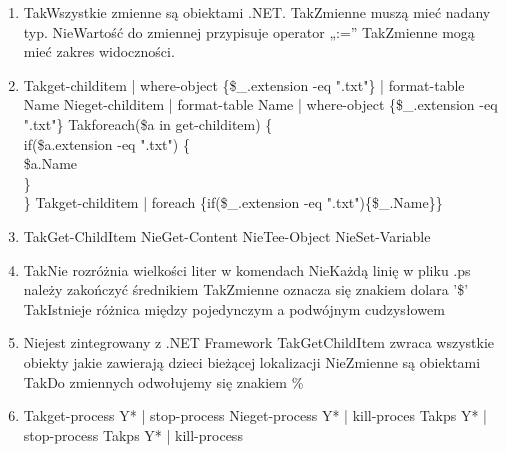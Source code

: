 \begin{enumerate}
		\newpage
		\item {}%
		{Tak}{Wszystkie zmienne są obiektami .NET.}%
		{Tak}{Zmienne muszą mieć nadany typ.}%
		{Nie}{Wartość do zmiennej przypisuje operator „:=”}%
		{Tak}{Zmienne mogą mieć zakres widoczności.}
		\item {}%
		{Tak}{get-childitem | where-object \{\$\_.extension -eq ".txt"\} | format-table Name}%
		{Nie}{get-childitem | format-table Name | where-object \{\$\_.extension -eq ".txt"\}}%
		{Tak}{foreach(\$a in get-childitem) \{\\
				if(\$a.extension -eq ".txt") \{\\
					\$a.Name\\
				\}\\
			\}}%
		{Tak}{get-childitem | foreach \{if(\$\_.extension -eq ".txt")\{\$\_.Name\}\}}
		\item {}%
		{Tak}{Get-ChildItem}%
		{Nie}{Get-Content}%
		{Nie}{Tee-Object}%
		{Nie}{Set-Variable}
		\item {}%
		{Tak}{Nie rozróżnia wielkości liter w komendach}%
		{Nie}{Każdą linię w pliku .ps należy zakończyć średnikiem}%
		{Tak}{Zmienne oznacza się znakiem dolara '\$'}%
		{Tak}{Istnieje różnica między pojedynczym a podwójnym cudzysłowem}
		\item {}%
		{Nie}{jest zintegrowany z .NET Framework}%
		{Tak}{GetChildItem zwraca wszystkie obiekty jakie zawierają dzieci bieżącej lokalizacji}%
		{Nie}{Zmienne są obiektami}%
		{Tak}{Do zmiennych odwołujemy się znakiem \%}
		\item {}%
		{Tak}{get-process Y* | stop-process}%
		{Nie}{get-process Y* | kill-proces}%
		{Tak}{ps Y* | stop-process}%
		{Tak}{ps Y* | kill-process}
		

\end{enumerate}

